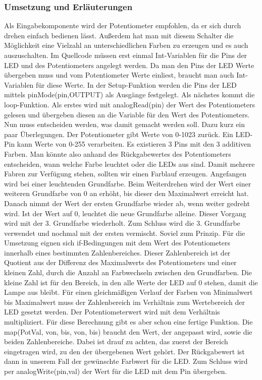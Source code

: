 \subsubsection{Umsetzung und Erläuterungen}
Als Eingabekomponente wird der Potentiometer empfohlen, da er sich durch drehen einfach bedienen lässt. Außerdem hat man mit diesem Schalter die Möglichkeit eine Vielzahl an unterschiedlichen Farben zu erzeugen und es auch auszuschalten. 
Im Quellcode müssen erst einmal Int-Variablen für die Pins der LED und des Potentiometers angelegt werden. Da man den Pins der LED Werte übergeben muss und vom Potentiometer Werte einliest, braucht man auch Int-Variablen für diese Werte.
In der Setup-Funktion werden die Pins der LED mittels pinMode(pin,OUTPUT) als Ausgänge festgelegt.
Als nächstes kommt die loop-Funktion. Als erstes wird mit analogRead(pin) der Wert des Potentiometers gelesen und übergeben diesen an die Variable für den Wert des Potentiometers.
Nun muss entscheiden werden, was damit gemacht werden soll. Dazu kurz ein paar Überlegungen. Der Potentiometer gibt Werte von 0-1023 zurück. Ein LED-Pin kann Werte von 0-255 verarbeiten. Es existieren 3 Pins mit den 3 additiven Farben. Man könnte also anhand des Rückgabewertes des Potentiometers entscheiden, wann welche Farbe leuchtet oder die LEDs aus sind. Damit mehrere Fabren zur Verfügung stehen, sollten wir einen Farblauf erzeugen. Angefangen wird bei einer leuchtenden Grundfarbe. Beim Weiterdrehen wird der Wert einer weiteren Grundfarbe von 0 an erhöht, bis dieser den Maximalwert erreicht hat. Danach nimmt der Wert der ersten Grundfarbe wieder ab, wenn weiter gedreht wird. Ist der Wert auf 0, leuchtet die neue Grundfarbe alleine. Dieser Vorgang wird mit der 3. Grundfarbe wiederholt. Zum Schluss wird die 3. Grundfarbe verwendet und nochmal mit der ersten vermischt.
Soviel zum Prinzip. Für die Umsetzung eignen sich if-Bedingungen mit dem Wert des Potentiometers innerhalb eines bestimmten Zahlenbereiches. Dieser Zahlenbereich ist der Quotient aus der Differenz des Maximalwerts des Potentiometers und einer kleinen Zahl, durch die Anzahl an Farbwechseln zwischen den Grundfarben. Die kleine Zahl ist für den Bereich, in den alle Werte der LED auf 0 stehen, damit die Lampe aus bleibt. Für einen gleichmäßigen Verlauf der Farben von Minimalwert bis Maximalwert muss der Zahlenbereich im Verhältnis zum Wertebereich der LED gesetzt werden. Der Potentiometerwert wird mit dem Verhältnis multipliziert. Für diese Berechnung gibt es aber schon eine fertige Funktion. Die map(PotVal, von, bis, von, bis) braucht den Wert, der angepasst wird, sowie die beiden Zahlenbereiche. Dabei ist drauf zu achten, das zuerst der Bereich eingetragen wird, zu den der übergebenen Wert gehört. Der Rückgabewert ist dann in unserem Fall der gewünschte Farbwert für die LED.
Zum Schluss wird per analogWrite(pin,val) der Wert für die LED mit dem Pin übergeben. 


